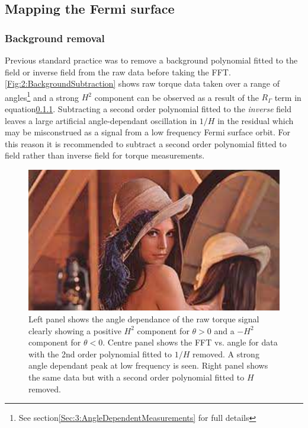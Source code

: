 \subsection{Mapping the Fermi surface}

\subsubsection{Background removal}
Previous standard practice was to remove a background polynomial fitted to the field or inverse field from the raw data before taking the FFT. \Fig\ref{Fig:2:BackgroundSubtraction} shows raw torque data taken over a range of angles\footnote{See section\ref{Sec:3:AngleDependentMeasurements} for full details} and a strong $H^2$ component can be observed as a result of the $R_{\Gamma}$ term in equation\ref{}. Subtracting a second order polynomial fitted to the \textit{inverse} field leaves a large artificial angle-dependant oscillation in $1/H$ in the residual which may be misconstrued as a signal from a low frequency Fermi surface orbit. For this reason it is recommended to subtract a second order polynomial fitted to field rather than inverse field for torque measurements.
\begin{figure}[h!]
    \begin{center}
        \includegraphics[scale=0.7]{Misc/TODO}
        \caption{Left panel shows the angle dependance of the raw torque signal  clearly showing a positive $H^2$ component for $\theta>0$ and a $-H^2$ component for $\theta<0$. Centre panel shows the FFT vs. angle for data with the 2nd order polynomial fitted to $1/H$ removed. A strong angle dependant peak at low frequency is seen. Right panel shows the same data but with a second order polynomial fitted to $H$ removed.}
        \label{Fig:2:BackgroundSubstraction}
    \end{center}
\end{figure}



